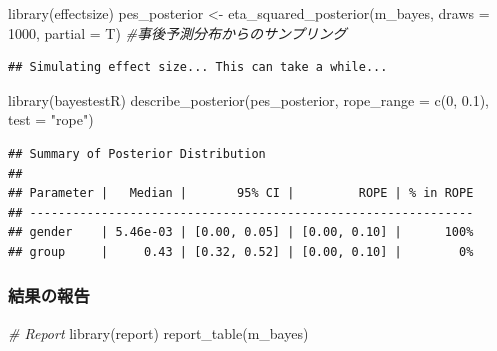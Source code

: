 \documentclass[
  ja=standard, xelatex, base=12pt]{bxjsreport}
\newenvironment{Shaded}{\begin{snugshade}}{\end{snugshade}}
\newcommand{\AttributeTok}[1]{\textcolor[rgb]{0.77,0.63,0.00}{#1}}
\newcommand{\CommentTok}[1]{\textcolor[rgb]{0.56,0.35,0.01}{\textit{#1}}}
\newcommand{\DecValTok}[1]{\textcolor[rgb]{0.00,0.00,0.81}{#1}}
\newcommand{\FloatTok}[1]{\textcolor[rgb]{0.00,0.00,0.81}{#1}}
\newcommand{\FunctionTok}[1]{\textcolor[rgb]{0.00,0.00,0.00}{#1}}
\newcommand{\NormalTok}[1]{#1}
\newcommand{\OtherTok}[1]{\textcolor[rgb]{0.56,0.35,0.01}{#1}}
\newcommand{\StringTok}[1]{\textcolor[rgb]{0.31,0.60,0.02}{#1}}
\begin{document}
\begin{Shaded}
\begin{Highlighting}[]
\FunctionTok{library}\NormalTok{(effectsize)}
\NormalTok{pes\_posterior }\OtherTok{\textless{}{-}} \FunctionTok{eta\_squared\_posterior}\NormalTok{(m\_bayes,}
                                       \AttributeTok{draws =} \DecValTok{1000}\NormalTok{, }
                                       \AttributeTok{partial =}\NormalTok{ T) }\CommentTok{\#事後予測分布からのサンプリング}
\end{Highlighting}
\end{Shaded}

\begin{verbatim}
## Simulating effect size... This can take a while...
\end{verbatim}

\begin{Shaded}
\begin{Highlighting}[]
\FunctionTok{library}\NormalTok{(bayestestR)}
\FunctionTok{describe\_posterior}\NormalTok{(pes\_posterior, }\AttributeTok{rope\_range =} \FunctionTok{c}\NormalTok{(}\DecValTok{0}\NormalTok{, }\FloatTok{0.1}\NormalTok{), }\AttributeTok{test =} \StringTok{"rope"}\NormalTok{)}
\end{Highlighting}
\end{Shaded}

\begin{verbatim}
## Summary of Posterior Distribution
## 
## Parameter |   Median |       95% CI |         ROPE | % in ROPE
## --------------------------------------------------------------
## gender    | 5.46e-03 | [0.00, 0.05] | [0.00, 0.10] |      100%
## group     |     0.43 | [0.32, 0.52] | [0.00, 0.10] |        0%
\end{verbatim}

\hypertarget{ux7d50ux679cux306eux5831ux544a-4}{%
\subsubsection{結果の報告}\label{ux7d50ux679cux306eux5831ux544a-4}}

\begin{Shaded}
\begin{Highlighting}[]
\CommentTok{\# Report}
\FunctionTok{library}\NormalTok{(report)}
\FunctionTok{report\_table}\NormalTok{(m\_bayes)}
\end{Highlighting}
\end{Shaded}
\end{document}
